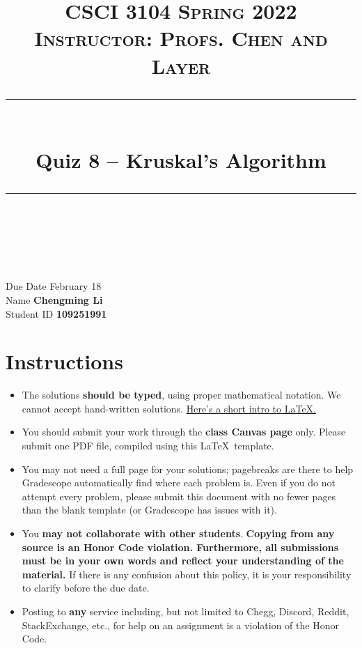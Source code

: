 \documentclass[11pt]{article}
\title{
\normalfont \normalsize 
\textsc{CSCI 3104 Spring 2022 \\ 
Instructor: Profs. Chen and Layer} \\
[10pt] 
\rule{\linewidth}{0.5pt} \\[6pt] 
\huge Quiz 8 -- Kruskal's Algorithm\\
\rule{\linewidth}{2pt}  \\[10pt]
}
\date{}
\theoremstyle{definition}
\theoremstyle{definition}
\theoremstyle{definition}
\begin{document}

\maketitle


\noindent
Due Date \dotfill February 18 \\
Name \dotfill \textbf{Chengming Li} \\
Student ID \dotfill \textbf{109251991} \\


\tableofcontents

\section{Instructions}
 \begin{itemize}
	\item The solutions \textbf{should be typed}, using proper mathematical notation. We cannot accept hand-written solutions. \href{http://ece.uprm.edu/~caceros/latex/introduction.pdf}{Here's a short intro to \LaTeX.}
	\item You should submit your work through the \textbf{class Canvas page} only. Please submit one PDF file, compiled using this \LaTeX \ template.
	\item You may not need a full page for your solutions; pagebreaks are there to help Gradescope automatically find where each problem is. Even if you do not attempt every problem, please submit this document with no fewer pages than the blank template (or Gradescope has issues with it).

	\item You \textbf{may not collaborate with other students}. \textbf{Copying from any source is an Honor Code violation. Furthermore, all submissions must be in your own words and reflect your understanding of the material.} If there is any confusion about this policy, it is your responsibility to clarify before the due date. 

	\item Posting to \textbf{any} service including, but not limited to Chegg, Discord, Reddit, StackExchange, etc., for help on an assignment is a violation of the Honor Code.
\end{itemize}
\end{document}
